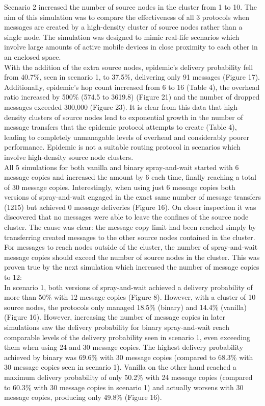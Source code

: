 \documentclass{article}
\begin{document}
\noindent Scenario 2 increased the number of source nodes in the cluster from 1 to 10. The aim of this simulation was to compare the effectiveness of all 3 protocols when messages are created by a high-density cluster of source nodes rather than a single node. The simulation was designed to mimic real-life scenarios which involve large amounts of active mobile devices in close proximity to each other in an enclosed space.\\
\newline With the addition of the extra source nodes, epidemic's delivery probability fell from 40.7\%, seen in scenario 1, to 37.5\%, delivering only 91 messages (Figure 17). Additionally, epidemic's hop count increased from 6 to 16 (Table 4), the overhead ratio increased by 500\% (574.5 to 3619.8) (Figure 21) and the number of dropped messages exceeded 300,000 (Figure 23). It is clear from this data that high-density clusters of source nodes lead to exponential growth in the number of message transfers that the epidemic protocol attempts to create (Table 4), leading to completely unmanagable levels of overhead and considerably poorer performance. Epidemic is not a suitable routing protocol in scenarios which involve high-density source node clusters.\\
\newline All 5 simulations for both vanilla and binary spray-and-wait started with 6 message copies and increased the amount by 6 each time, finally reaching a total of 30 message copies. Interestingly, when using just 6 message copies both versions of spray-and-wait engaged in the exact same number of message transfers (1215) but achieved 0 message deliveries (Figure 16). On closer inspection it was discovered that no messages were able to leave the confines of the source node cluster. The cause was clear: the message copy limit had been reached simply by transferring created messages to the other source nodes contained in the cluster. For messages to reach nodes outside of the cluster, the number of spray-and-wait message copies should exceed the number of source nodes in the cluster. This was proven true by the next simulation which increased the number of message copies to 12:\\
\newline In scenario 1, both versions of spray-and-wait achieved a delivery probability of more than 50\% with 12 message copies (Figure 8). However, with a cluster of 10 source nodes, the protocols only managed 18.5\% (binary) and 14.4\% (vanilla) (Figure 16). However, increasing the number of message copies in later simulations saw the delivery probability for binary spray-and-wait reach comparable levels of the delivery probability seen in scenario 1, even exceeding them when using 24 and 30 message copies. The highest delivery probability achieved by binary was 69.6\% with 30 message copies (compared to 68.3\% with 30 message copies seen in scenario 1). Vanilla on the other hand reached a maximum delivery probability of only 50.2\% with 24 message copies (compared to 60.3\% with 30 message copies in scenario 1) and actually worsens with 30 message copies, producing only 49.8\% (Figure 16).\\
\end{document}

